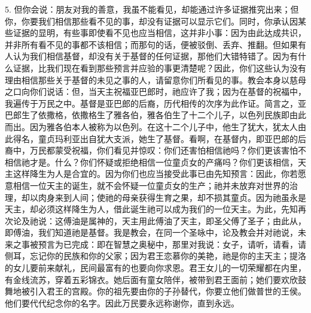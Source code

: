5. 但你会说：朋友对我的善意，我虽不能看见，却能通过许多证据推究出来；但你，你要我们相信那些看不见的事，却没有证据可以显示它们。同时，你承认因某些证据的显明，有些事即使看不见也应当相信，这并非小事：因为由此达成共识，并非所有看不见的事都不该相信；而那句的话，便被驳倒、丢弃、推翻。但如果有人认为我们相信基督，却没有关于基督的任何证据，那他们大错特错了。因为有什么证据，比我们现在看到那些预言并应验的事更清楚呢？因此，你们这些认为没有理由相信那些关于基督的未见之事的人，请留意你们所看见的事。教会本身以慈母之口向你们说话：但，当天主祝福亚巴郎时，祂应许了我；因为在基督的祝福中，我遍传于万民之中。基督是亚巴郎的后裔，历代相传的次序为此作证。简言之，亚巴郎生了依撒格，依撒格生了雅各伯，雅各伯生了十二个儿子，以色列民族即由此而出。因为雅各伯本人被称为以色列。在这十二个儿子中，他生了犹大，犹太人由此得名，童贞玛利亚出自犹大支派，她生了基督。看啊，在基督内，即亚巴郎的后裔中，万民都蒙受祝福，你们看见并惊叹：你们还害怕相信祂吗？你们更该害怕不相信祂才是。什么？你们怀疑或拒绝相信一位童贞女的产痛吗？你们更该相信，天主这样降生为人是合宜的。因为你们也应当接受此事已由先知预言：因此，你若愿意相信一位天主的诞生，就不会怀疑一位童贞女的生产；祂并未放弃对世界的治理，却以肉身来到人间；使祂的母亲获得生育之果，却不损其童贞。因为祂虽永是天主，却必须这样降生为人，借此诞生祂可以成为我们的一位天主。为此，先知再次论及祂说：这傅油是属神的，天主用此傅油了天主，即圣父傅了圣子；由此从，即傅油，我们知道祂是基督。我是教会，在同一个圣咏中，论及教会并对祂说，未来之事被预言为已完成：即在智慧之奥秘中，那里对我说：女子，请听，请看，请侧耳，忘记你的民族和你的父家；因为君王恋慕你的美艳，祂是你的主天主；提洛的女儿要前来献礼，民间最富有的也要向你求恩。君王女儿的一切荣耀都在内里，有金线流苏，穿着五彩锦衣。她后面有童女陪伴，被带到君王面前；她们要欢欣鼓舞地被引入君王的宫殿。你的祖先要由你的子孙替代，你要立他们做普世的王侯。他们要代代纪念你的名字。因此万民要永远称谢你，直到永远。\par

